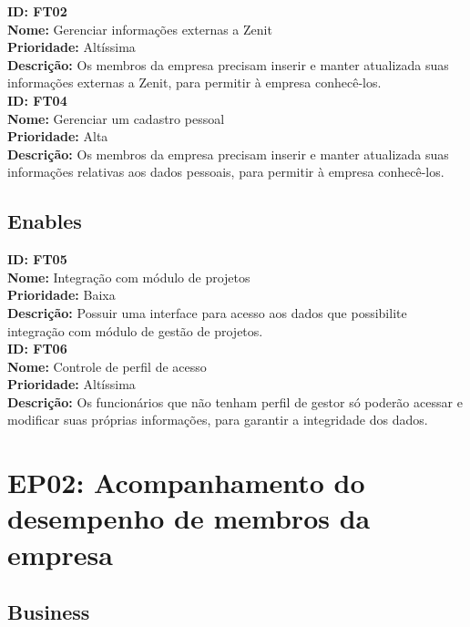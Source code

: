 \begin{anexosenv}
\indent \textbf{ID: FT02 \\
Nome:} Gerenciar informações externas a Zenit\\
\indent \textbf{Prioridade:} Altíssima\\
\indent \textbf{Descrição:} Os membros da empresa precisam inserir e manter atualizada suas informações externas a Zenit, para permitir à empresa conhecê-los.\\

\indent \textbf{ID: FT04 \\
Nome:} Gerenciar um cadastro pessoal\\
\indent \textbf{Prioridade:} Alta\\
\indent \textbf{Descrição:} Os membros da empresa precisam inserir e manter atualizada suas informações relativas aos dados pessoais, para permitir à empresa conhecê-los.\\

\subsection[Enables]{Enables}

\indent \textbf{ID: FT05\\
Nome:} Integração com módulo de projetos\\
\indent \textbf{Prioridade:} Baixa\\
\indent \textbf{Descrição:} Possuir uma interface para acesso aos dados que possibilite integração com módulo de gestão de projetos.\\

\indent \textbf{ID: FT06\\
Nome:} Controle de perfil de acesso\\
\indent \textbf{Prioridade:} Altíssima\\
\indent \textbf{Descrição:} Os funcionários que não tenham perfil de gestor só poderão acessar e modificar suas próprias informações, para garantir a integridade dos dados.\\

\section[EP02: Acompanhamento do desempenho de membros da empresa]{EP02: Acompanhamento do desempenho de membros da empresa}

\subsection[Business]{Business}


\end{anexosenv}
